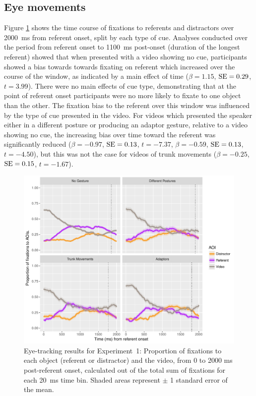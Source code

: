 \documentclass[a4paper,man,natbib]{apa6}
\newcommand{\resultsLM}[3]{$\beta = #1$, $\textnormal{SE} = #2$, $t #3$}
\let\oldtodo\todo
\renewcommand*{\todo}[1]{\oldtodo[fancyline]{#1}}
\begin{document}
\subsection{Eye movements}
Figure \ref{fig:v1_eye} shows the time course of fixations to referents and distractors over 2000~ms from referent onset, split by each type of cue.
Analyses conducted over the period from referent onset to 1100~ms post-onset (duration of the longest referent) showed that when presented with a video showing no cue, participants showed a bias towards towards fixating on referent which increased over the course of the window, as indicated by a main effect of time (\resultsLM{1.15}{0.29}{=3.99}).
There were no main effects of cue type, demonstrating that at the point of referent onset participants were no more likely to fixate to one object than the other.
The fixation bias to the referent over this window was influenced by the type of cue presented in the video. 
For videos which presented the speaker either in a different posture or producing an adaptor gesture, relative to a video showing no cue, the increasing bias over time toward the referent was significantly reduced (\resultsLM{-0.97}{0.13}{=-7.37}, \resultsLM{-0.59}{0.13}{=-4.50}), but this was not the case for videos of trunk movements (\resultsLM{-0.25}{0.15}{=-1.67}). 

\begin{figure}[Ht]
  \centering
	\includegraphics[width=\linewidth]{./img/e7_fixations.pdf}
  \caption{Eye-tracking results for Experiment~1: Proportion of fixations to each object (referent or distractor) and the video, from 0 to 2000 ms post-referent onset, calculated out of the total sum of fixations for each 20~ms time bin. Shaded areas represent $\pm$ 1 standard error of the mean.}
  \label{fig:v1_eye}
\end{figure}
\end{document}
